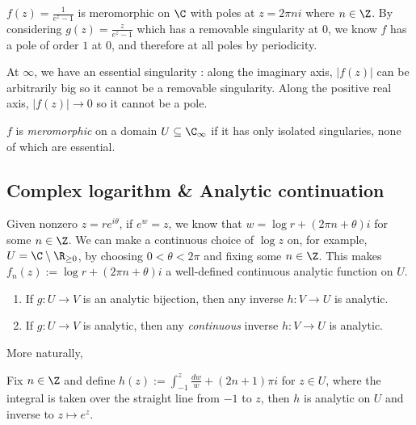 \documentclass[a4paper]{article}
\begin{document}
\begin{eg}
  \(f(z) = \frac{1}{e^z - 1}\) is meromorphic on \(\C\) with poles at \(z = 2\pi n i\) where \(n \in \Z\). By considering \(g(z) = \frac{z}{e^z - 1}\) which has a removable singularity at \(0\), we know \(f\) has a pole of order \(1\) at \(0\), and therefore at all poles by periodicity.

  At \(\infty\), we have an essential singularity : along the imaginary axis, \(|f(z)|\) can be arbitrarily big so it cannot be a removable singularity. Along the positive real axis, \(|f(z)| \to 0\) so it cannot be a pole.
\end{eg}

\begin{definition}
  \(f\) is \emph{meromorphic} on a domain \(U \subseteq \C_\infty\)  if it has only isolated singularies, none of which are essential.
\end{definition}

\subsection{Complex logarithm \& Analytic continuation}

Given nonzero \(z = r e^{i \theta}\), if \(e^w = z\), we know that \(w = \log r + (2\pi n + \theta) i\) for some \(n \in \Z\). We can make a continuous choice of \(\log z\) on, for example, \(U = \C \setminus \R_{\geq 0}\), by choosing \(0 < \theta < 2\pi\) and fixing some \(n \in \Z\). This makes \(f_n(z) := \log r + (2\pi n + \theta)i\) a well-defined continuous analytic function on \(U\).

\begin{note}\leavevmode
  \begin{enumerate}
  \item If \(g: U \to V\) is an analytic bijection, then any inverse \(h: V \to U\) is analytic.
  \item If \(g: U \to V\) is analytic, then any \emph{continuous} inverse \(h: V \to U\) is analytic.
  \end{enumerate}
\end{note}

More naturally,

\begin{proposition}
  Fix \(n \in \Z\) and define \(h(z) := \int_{-1}^z \frac{dw}{w} + (2n + 1)\pi i\) for \(z \in U\), where the integral is taken over the straight line from \(-1\) to \(z\), then \(h\) is analytic on \(U\) and inverse to \(z \mapsto e^z\).
\end{proposition}
\end{document}
